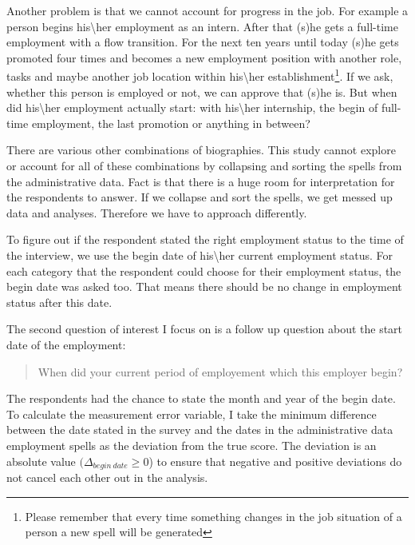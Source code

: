 Another problem is that we cannot account for progress in the job. For example a person begins his\textbackslash her employment as an intern. After that (s)he gets a full-time employment with a flow transition. For the next ten years until today (s)he gets promoted four times and becomes a new employment position with another role, tasks and maybe another job location within his\textbackslash her establishment\footnote{Please remember that every time something changes in the job situation of a person a new spell will be generated}. If we ask, whether this person is employed or not, we can approve that (s)he is. But when did his\textbackslash her employment actually start: with his\textbackslash her internship, the begin of full-time employment, the last promotion or anything in between?

There are various other combinations of biographies. This study cannot explore or account for all of these combinations by collapsing and sorting the spells from the administrative data. Fact is that there is a huge room for interpretation for the respondents to answer. If we collapse and sort the spells, we get messed up data and analyses. Therefore we have to approach differently.

To figure out if the respondent stated the right employment status to the time of the interview, we use the begin date of his\textbackslash her current employment status. For each category that the respondent could choose for their employment status, the begin date was asked too. That means there should be no change in employment status after this date.

The second question of interest I focus on is a follow up question about the start date of the employment:


\begin{quote}
\begin {small}

When did your current period of employement which this employer begin?

\end{small}
\end{quote}

The respondents had the chance to state the month and year of the begin date. To calculate the measurement error variable, I take the minimum difference between the date stated in the survey and the dates in the administrative data employment spells as the deviation from the true score. The deviation is an absolute value \((\Delta_{begin \ date}\geq0\)) to ensure that negative and positive deviations do not cancel each other out in the analysis.


